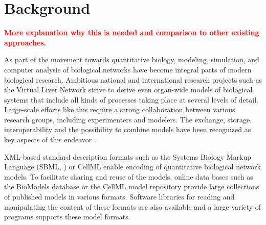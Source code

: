 \documentclass[10pt]{bmc_article}
\newenvironment{bmcformat}{\baselineskip20pt\sloppy\setboolean{publ}{false}}{\baselineskip20pt\sloppy}
\newcommand{\TODO}[1]{\textcolor{red}{\textbf{#1}}}
\begin{document}
\begin{bmcformat}






\section*{Background}

\TODO{More explanation why this is needed and comparison to other existing
approaches.}

As part of the movement towards quantitative biology, modeling, 
simulation, and computer analysis of biological networks have become integral
parts of modern biological research. Ambitious national and international
research projects such as the Virtual Liver Network \cite{Holzhuetter2012}
strive to derive even organ-wide models of biological systems that include all
kinds of processes taking place at several levels of detail. Large-scale efforts
like this require a strong collaboration between various research groups,
including experimenters and modelers. The exchange, storage, interoperability
and the possibility to combine models have been recognized as key aspects of
this endeavor \cite{Liebermeister2009sta}.

XML-based standard description formats \cite{Bray2000} such as the Systems
Biology Markup Language (SBML, \cite{Hucka2004}) or CellML \cite{Lloyd2004}
enable encoding of quantitative biological network models.
To facilitate sharing and reuse of the models, online data bases such as the
BioModels database \cite{Novere2006a} or the CellML model repository
\cite{Lloyd2008} provide large collections of published models in various
formats.
Software libraries for reading and manipulating the content
of these formats are also available \cite{Bornstein2008, Miller2010,
Draeger2011b} and a large variety of programs supports these model formats.


\end{bmcformat}
\end{document}
